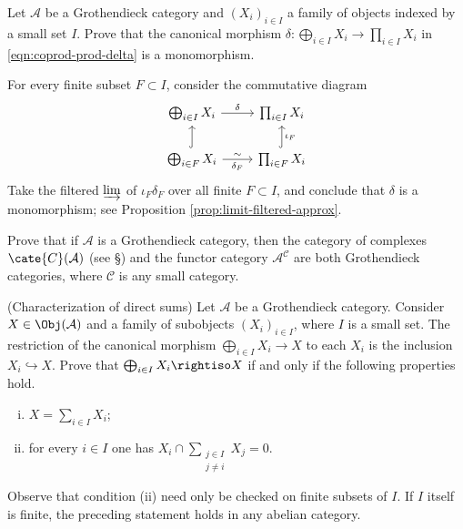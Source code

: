 \begin{Exercises}
	\item Let $\mathcal{A}$ be a Grothendieck category and
	$(X_i)_{i\in I}$ a family of objects indexed by a small set $I$. Prove
	that the canonical morphism
	$\delta:\bigoplus_{i\in I}X_i\to\prod_{i\in I}X_i$ in
	\eqref{eqn:coprod-prod-delta} is a monomorphism.

	\begin{hint}
		For every finite subset $F\subset I$, consider the commutative diagram
		\[\begin{tikzcd}
			\bigoplus_{i \in I} X_i \arrow[r, "\delta"] & \prod_{i \in I} X_i \\
			\bigoplus_{i \in F} X_i \arrow[r, "\sim", "\delta_F"'] \arrow[hookrightarrow, u] & \prod_{i \in F} X_i \arrow[hookrightarrow, u, "{\iota_F}"']
		\end{tikzcd}\]
		Take the filtered $\varinjlim$ of $\iota_F\delta_F$ over all finite
		$F\subset I$, and conclude that $\delta$ is a monomorphism; see
		Proposition \ref{prop:limit-filtered-approx}.
	\end{hint}

	\item Prove that if $\mathcal{A}$ is a Grothendieck category, then the
	category of complexes $\cate{C}(\mathcal{A})$ (see
	\S{}) and the functor category
	$\mathcal{A}^{\mathcal{C}}$ are both Grothendieck categories, where
	$\mathcal{C}$ is any small category.

	\item (Characterization of direct sums) Let $\mathcal{A}$ be a
	Grothendieck category. Consider $X\in\Obj(\mathcal{A})$ and a family of
	subobjects $(X_i)_{i\in I}$, where $I$ is a small set. The restriction of
	the canonical morphism $\bigoplus_{i\in I}X_i\to X$ to each $X_i$ is the
	inclusion $X_i\hookrightarrow X$. Prove that
	$\bigoplus_{i\in I}X_i\rightiso X$ if and only if the following
	properties hold.
	\begin{enumerate}[(i)]
		\item $X=\sum_{i\in I}X_i$;
		\item for every $i\in I$ one has
		$X_i\cap\sum_{\substack{j\in I\\j\neq i}}X_j=0$.
	\end{enumerate}
	Observe that condition (ii) need only be checked on finite subsets of
	$I$. If $I$ itself is finite, the preceding statement holds in any abelian
	category.


\end{Exercises}
